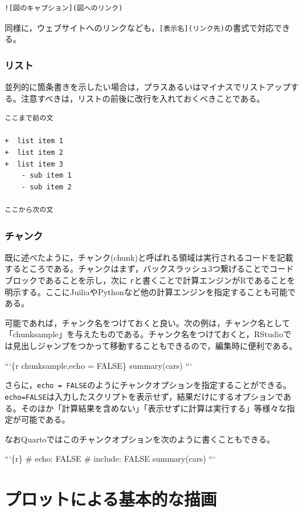 \documentclass[
  a4paper,
]{ltjsbook}
\begin{document}
\begin{verbatim}
![図のキャプション](図へのリンク)
\end{verbatim}

同様に，ウェブサイトへのリンクなども，\texttt{{[}表示名{]}(リンク先)}の書式で対応できる。

\subsubsection{リスト}\label{ux30eaux30b9ux30c8}

並列的に箇条書きを示したい場合は，プラスあるいはマイナスでリストアップする。注意すべきは，リストの前後に改行を入れておくべきことである。

\begin{verbatim}
ここまで前の文

+  list item 1
+  list item 2
+  list item 3
    - sub item 1
    - sub item 2

ここから次の文
\end{verbatim}

\subsubsection{チャンク}\label{ux30c1ux30e3ux30f3ux30af}

既に述べたように，チャンク(chunk)と呼ばれる領域は実行されるコードを記載するところである。チャンクはまず，バックスラッシュ3つ繋げることでコードブロックであることを示し，次に
\texttt{r}と書くことで計算エンジンがRであることを明示する。ここにJuiliaやPythonなど他の計算エンジンを指定することも可能である。

可能であれば，チャンク名をつけておくと良い。次の例は，チャンク名として「chunksample」を与えたものである。チャンク名をつけておくと，RStudioでは見出しジャンプをつかって移動することもできるので，編集時に便利である。

```\{r chunksample,echo = FALSE\} summary(cars) ```

さらに，\texttt{echo\ =\ FALSE}のようにチャンクオプションを指定することができる。\texttt{echo=FALSE}は入力したスクリプトを表示せず，結果だけにするオプションである。そのほか「計算結果を含めない」「表示せずに計算は実行する」等様々な指定が可能である。

なおQuartoではこのチャンクオプションを次のように書くこともできる。

```\{r\} \#\textbar{} echo: FALSE \#\textbar{} include: FALSE
summary(cars) ```

\section{プロットによる基本的な描画}\label{ux30d7ux30edux30c3ux30c8ux306bux3088ux308bux57faux672cux7684ux306aux63cfux753b}
\end{document}
